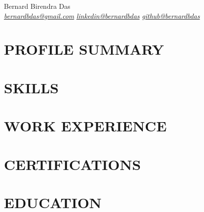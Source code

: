 \documentclass{main}
\begin{document}
\begin{center}
  \Huge{\color{title}\fontspec[Path =
    \pathtitlefont]{\secondnamefont} Bernard \fontspec[Path =
  \pathtitlefont]{\firstnamefont} Birendra Das} \\
  \vspace{0.1em}
  \href{mailto:bernardbdas@gmail.com}{\textit{bernardbdas@gmail.com}}\hspace{0.4em}\CircSteel\hspace{0.4em}
  \href{https://linkedin.com/in/bernardbdas}{\textit{linkedin@bernardbdas}}\hspace{0.4em}\CircSteel\hspace{0.4em}
  \href{https://github.com/bernardbdas}{\textit{github@bernardbdas}}
\end{center}

\vspace{-17pt}
\section{PROFILE SUMMARY}


\vspace{-8pt}
\section{SKILLS}


% 

\section{WORK EXPERIENCE}


\section{CERTIFICATIONS}


\section{EDUCATION}


% 
\end{document}
